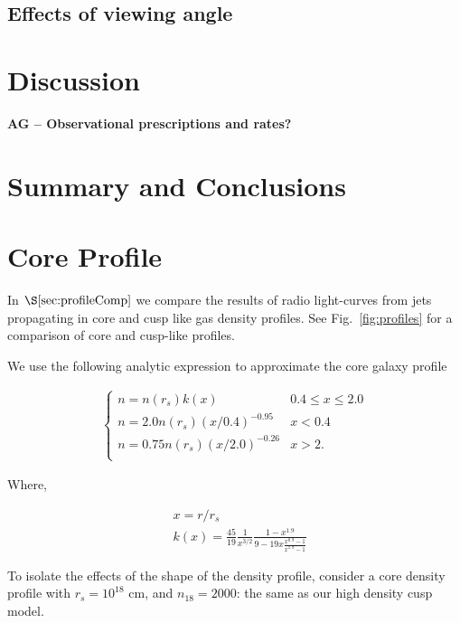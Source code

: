\documentclass[usenatbib,fleqn]{mnras}
\begin{document}
\subsection{Effects of viewing angle}


\section{Discussion}
\label{sec:disc}
{\bf AG -- Observational prescriptions and rates?}

\section{Summary and Conclusions}
\label{sec:conc}

\appendix
\section{Core Profile}
\label{app:core}
In $\S\ref{sec:profileComp}$ we compare the results of radio
light-curves from jets propagating in core and cusp like gas density
profiles. See Fig.~\ref{fig:profiles} for a comparison of core and
cusp-like profiles. 

We use the following analytic expression to approximate the core
galaxy profile

\begin{align}
\begin{cases}
n=n(r_s) k(x) & 0.4 \leq x\leq 2.0\\
n = 2.0 n(r_s) (x/0.4)^{-0.95} & x < 0.4\\
n = 0.75 n(r_s) (x/2.0)^{-0.26} & x>2.\\
\end{cases}
\label{eq:cores}
\end{align}

Where, 

\begin{align}
  &x=r/r_s\\\nonumber
  &k(x)=\frac{45}{19} \frac{1}{x^{3/2}} \frac{1-x^{1.9}}{9-19
      x\frac{x^{0.9}-1}{x^{1.9}-1}}
\end{align}

To isolate the effects of the shape of the density profile, consider a
core density profile with $r_s=10^{18}$ cm, and $n_{18}=2000$: the
same as our high density cusp model.

\clearpage
  \footnotesize{
    
    
  }
\end{document}
